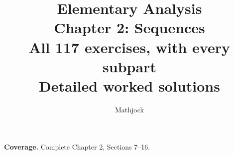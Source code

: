
\title{\textbf{Elementary Analysis}\\[0.3em]
Chapter 2: Sequences\\[0.4em]
\large All 117 exercises, with every subpart\\
Detailed worked solutions}
\author{Mathjock}
\date{}

\maketitle
\bookinfo
\par\textbf{Coverage.} Complete Chapter 2, Sections 7--16.
\tableofcontents
\clearpage
\setcounter{section}{6}

\clearpage

\clearpage

\clearpage

\clearpage

\clearpage

\clearpage

\clearpage

\clearpage

\clearpage


